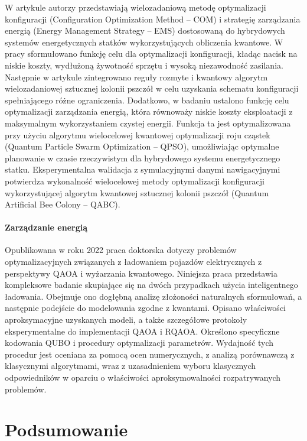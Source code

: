 \documentclass[a4paper,11pt]{article}
\begin{document}
W artykule \cite{si2022configuration} autorzy przedstawiają wielozadaniową metodę optymalizacji konfiguracji (Configuration Optimization Method -- COM) i strategię zarządzania energią (Energy Management Strategy -- EMS) dostosowaną do hybrydowych systemów energetycznych statków wykorzystujących obliczenia kwantowe. W pracy sformułowano funkcję celu dla optymalizacji konfiguracji, kładąc nacisk na niskie koszty, wydłużoną żywotność sprzętu i wysoką niezawodność zasilania. Następnie w artykule zintegrowano reguły rozmyte i kwantowy algorytm wielozadaniowej sztucznej kolonii pszczół w celu uzyskania schematu konfiguracji spełniającego różne ograniczenia. Dodatkowo, w badaniu ustalono funkcję celu optymalizacji zarządzania energią, która równoważy niskie koszty eksploatacji z maksymalnym wykorzystaniem czystej energii. Funkcja ta jest optymalizowana przy użyciu algorytmu wielocelowej kwantowej optymalizacji roju cząstek (Quantum Particle Swarm Optimization -- QPSO), umożliwiając optymalne planowanie w czasie rzeczywistym dla hybrydowego systemu energetycznego statku. Eksperymentalna walidacja z symulacyjnymi danymi nawigacyjnymi potwierdza wykonalność wielocelowej metody optymalizacji konfiguracji wykorzystującej algorytm kwantowej sztucznej kolonii pszczół (Quantum Artificial Bee Colony -- QABC).

\paragraph{Zarządzanie energią}

Opublikowana w roku 2022 praca doktorska \cite{veshchezerova2022quantum} dotyczy problemów optymalizacyjnych związanych z ładowaniem pojazdów elektrycznych z perspektywy QAOA i wyżarzania kwantowego. Niniejsza praca przedstawia kompleksowe badanie skupiające się na dwóch przypadkach użycia inteligentnego ładowania. Obejmuje ono dogłębną analizę złożoności naturalnych sformułowań, a następnie podejście do modelowania zgodne z kwantami. Opisano właściwości aproksymacyjne uzyskanych modeli, a także szczegółowe protokoły eksperymentalne do implementacji QAOA i RQAOA. Określono specyficzne kodowania QUBO i procedury optymalizacji parametrów. Wydajność tych procedur jest oceniana za pomocą ocen numerycznych, z analizą porównawczą z klasycznymi algorytmami, wraz z uzasadnieniem wyboru klasycznych odpowiedników w oparciu o właściwości aproksymowalności rozpatrywanych problemów.


\section{Podsumowanie}
\end{document}
